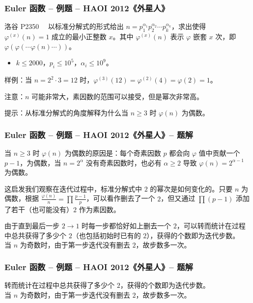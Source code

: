 \documentclass{../pkslide}
\begin{document}
\begin{structuregreen}

\begin{frame}
  \frametitle{Euler 函数 -- 例题 -- HAOI 2012《外星人》}
  \begin{block}{洛谷 P2350\ \ \href{https://www.luogu.com.cn/problem/P2350}{\color{blue!30!white}\footnotesize\faExternalLink}}
    以标准分解式的形式给出 $n = p_1^{\alpha_1} p_2^{\alpha_2} \cdots p_k^{\alpha_k}$，求出使得 $\varphi^{(x)}(n) = 1$ 成立的最小正整数 $x$。其中 $\varphi^{(x)}(n)$ 表示 $\varphi$ 嵌套 $x$ 次，即 $\varphi(\varphi( \cdots \varphi(n) \cdots ))$。
    
    \begin{itemize}
      \item $k \le 2000$，$p_i \le {10}^5$，$\alpha_i \le {10}^9$。
    \end{itemize}
  \end{block}
  
  样例：当 $n = 2^2 \cdot 3 = 12$ 时，$\varphi^{(3)}(12) = \varphi^{(2)}(4) = \varphi(2) = 1$。
  
  注意：$n$ 可能非常大，素因数的范围可以接受，但是幂次非常高。
  
  \pause
  \emptyline
  提示：从标准分解式的角度解释为什么当 $n \ge 3$ 时 $\varphi(n)$ 为偶数。
\end{frame}

\begin{frame}
  \frametitle{Euler 函数 -- 例题 -- HAOI 2012《外星人》-- 题解}
  当 $n \ge 3$ 时 $\varphi(n)$ 为偶数的原因是：每个奇素因数 $p$ 都会向 $\varphi$ 值中贡献一个 $p - 1$，为偶数，当 $n = 2^\alpha$ 没有奇素因数时，也必有 $\alpha \ge 2$ 导致 $\varphi(n) = 2^{\alpha - 1}$ 为偶数。
  
  \pause
  \emptyline
  这启发我们观察在迭代过程中，标准分解式中 $2$ 的幂次是如何变化的。只要 $n$ 为偶数，根据 $\frac{\varphi(n)}{n} = \prod \frac{p - 1}{p}$，可以看作删去了一个 $2$，但又通过 $\prod (p - 1)$ 添加了若干（也可能没有）$2$ 作为素因数。
  
  \pause
  \emptyline
  由于直到最后一步 $2 \to 1$ 时每一步都恰好如上删去一个 $2$，可以转而统计在过程中总共获得了多少个 $2$（\alert{也包括初始时已有的 $2$}），获得的个数即为迭代步数。\\
  当 $n$ 为奇数时，由于第一步迭代没有删去 $2$，故步数多一次。
\end{frame}

\begin{frame}
  \frametitle{Euler 函数 -- 例题 -- HAOI 2012《外星人》-- 题解}
  转而统计在过程中总共获得了多少个 $2$，获得的个数即为迭代步数。\\
  当 $n$ 为奇数时，由于第一步迭代没有删去 $2$，故步数多一次。
  

\end{frame}
\end{structuregreen}
\end{document}
